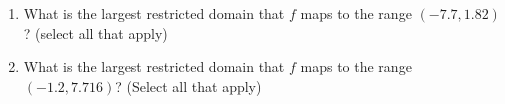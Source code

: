 \documentclass{ximera}
\begin{document}
\begin{exercise}
\begin{enumerate}
          \begin{multipleChoice}
          \end{multipleChoice}
        \item What is the largest restricted domain that $ f $ maps to the range $ (-7.7, 1.82) $?  (select all that apply)
          \begin{multipleChoice}
          \end{multipleChoice}
        \item What is the largest restricted domain that $ f $ maps to the range $ (-1.2, 7.716) $?  (Select all that apply)
        \begin{multipleChoice}
        \end{multipleChoice}
   \end{enumerate}
 \end{exercise}
\end{document}
